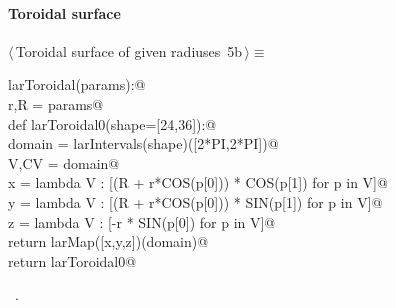 \documentclass[11pt,oneside]{article}	%
\begin{document}
\paragraph{Toroidal surface}
\begin{flushleft} \small \label{scrap11}
\protect{}$\langle\,$Toroidal surface of given radiuses\nobreak\ {\footnotesize 5b}$\,\rangle\equiv$
\vspace{-1ex}
\begin{list}{}{} \item
\mbox{}\verb@def larToroidal(params):@\\
\mbox{}\verb@   r,R = params@\\
\mbox{}\verb@   def larToroidal0(shape=[24,36]):@\\
\mbox{}\verb@      domain = larIntervals(shape)([2*PI,2*PI])@\\
\mbox{}\verb@      V,CV = domain@\\
\mbox{}\verb@      x = lambda V : [(R + r*COS(p[0])) * COS(p[1]) for p in V]@\\
\mbox{}\verb@      y = lambda V : [(R + r*COS(p[0])) * SIN(p[1]) for p in V]@\\
\mbox{}\verb@      z = lambda V : [-r * SIN(p[0]) for p in V]@\\
\mbox{}\verb@      return larMap([x,y,z])(domain)@\\
\mbox{}\verb@   return larToroidal0@\\
\mbox{}\verb@@{\NWsep}
\end{list}
\vspace{-1ex}
\footnotesize\addtolength{\baselineskip}{-1ex}
\begin{list}{}{\setlength{\itemsep}{-\parsep}\setlength{\itemindent}{-\leftmargin}}
\item \NWtxtMacroRefIn\ .
\end{list}
\end{flushleft}
\end{document}
